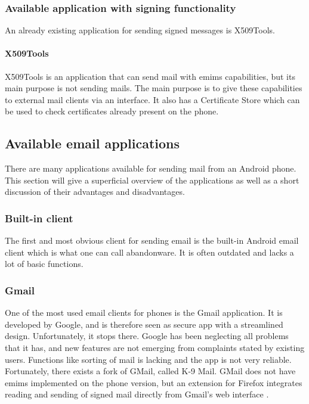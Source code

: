 \newpage

\subsubsection{Available application with signing functionality}
An already existing application for sending signed messages is X509Tools.

\paragraph{X509Tools} \hfill
\newline
X509Tools is an application that can send mail with \gls{emims} capabilities, but its main purpose is not sending mails. The main purpose is to give these capabilities to external mail clients via an interface. It also has a Certificate Store which can be used to check certificates already present on the phone. 

\subsection{Available email applications}
There are many applications available for sending mail from an Android phone. This section will give a superficial overview of the applications as well as a short discussion of their advantages and disadvantages.

\subsubsection{Built-in client}
The first and most obvious client for sending email is the built-in Android email client which is what one can call abandonware. It is often outdated and lacks a lot of basic functions.

\subsubsection{Gmail}
One of the most used email clients for phones is the Gmail application. It is developed by Google, and is therefore seen as secure app with a streamlined design. Unfortunately, it stops there. Google has been neglecting all problems that it has, and new features are not emerging from complaints stated by existing users. Functions like sorting of mail is lacking and the app is not very reliable. Fortunately, there exists a fork of GMail, called K-9 Mail. GMail does not have \gls{emims} implemented on the phone version, but an extension for Firefox integrates reading and sending of signed mail directly from Gmail's web interface \cite{bib:gmail}.

